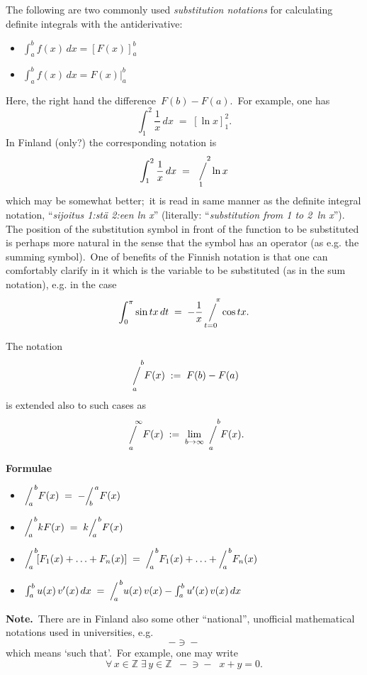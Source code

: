 \documentclass[12pt]{article}
\newcommand{\sijoitus}[2]%
{\operatornamewithlimits{\Big/}_{\!\!\!#1}^{\,#2}}
\begin{document}
The following are two commonly used {\em substitution notations} for calculating definite integrals with the antiderivative:
\begin{itemize}
\item $\int_a^b f(x)\,dx = \left[F(x)\right]_a^b$
\item $\int_a^b f(x)\,dx = F(x)|_a^b$
\end{itemize}
Here, the right hand  the difference \,$F(b)-F(a)$. \,For example, one has
      $$\int_1^2\frac{1}{x}\,dx \;=\; \left[\ln x\right]_1^2.$$
In Finland (only?) the corresponding notation is
      $$\int_1^2\frac{1}{x}\,dx \;=\; \sijoitus{1}{\quad 2}\ln x$$
which may be somewhat better;\, it is read in same manner as the definite integral notation, ``{\em sijoitus 1:st\"a 2:een ln x}'' (literally: ``{\em substitution from 1 to 2 \,ln x}'').\, The position of the substitution symbol in front of the function to be substituted is perhaps more natural in the sense that the symbol has an operator  (as e.g. the summing symbol).\, One of benefits of the Finnish notation is that one can comfortably clarify in it which is the variable to be substituted (as in the sum notation), e.g. in the case
  $$\int_0^\pi\sin{tx}\,dt \;=\; -\frac{1}{x}\sijoitus{t = 0}{\quad \pi}\cos{tx}.$$

The notation
  $$\sijoitus{a}{\quad b}\!F(x) \;:=\; F(b)-F(a)$$
is extended also to such cases as 
  $$\sijoitus{a}{\quad\infty}\!F(x) \;:=\; 
    \lim_{b\to\infty}\sijoitus{a}{\quad b}\!F(x).$$


\textbf{Formulae} 
\begin{itemize}
\item \,$\sijoitus{a}{b}\!F(x) \;=\; -\!\sijoitus{b}{a}\!F(x)$
\item \,$\sijoitus{a}{b}\!kF(x) \;=\; k\!\sijoitus{a}{b}\!F(x)$
\item \,$\sijoitus{a}{b}\![F_1(x)+\ldots+F_n(x)] \;=\; 
  \sijoitus{a}{b}\!F_1(x)+\ldots+\sijoitus{a}{b}\!F_n(x)$
\item \,$\int_a^b u(x)\,v'(x)\,dx \;=\; \sijoitus{a}{b}\!u(x)\,v(x)
  -\int_a^b u'(x)\,v(x)\,dx$
\end{itemize}


\textbf{Note.}\, There are in Finland also some other ``national'', unofficial mathematical notations used in universities, e.g.
$$-\!\!\!\ni\!\!\!-$$
which means `such that'.\, For example, one may write
$$\forall\, x \in \mathbb{Z}\; \exists\, y \in \mathbb{Z}\;\; -\!\!\!\ni\!\!\!- \;\; x\!+\!y = 0.$$

\end{document}
